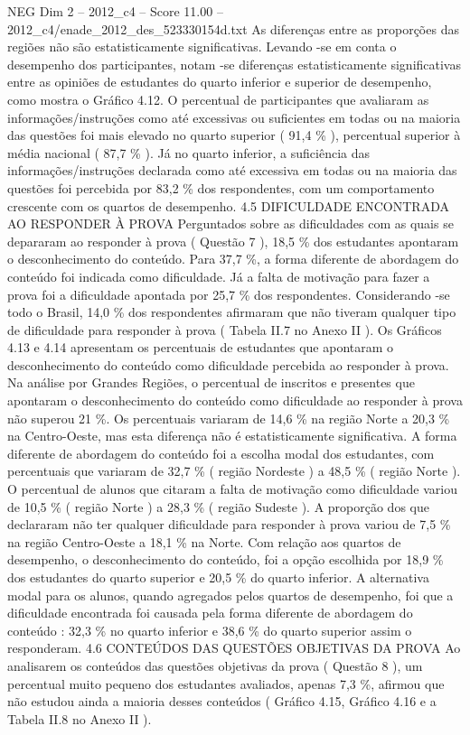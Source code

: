 \begin{textsample}{NEG Dim 2 – 2012\_c4 – Score 11.00 – 2012\_c4/enade\_2012\_des\_523330154d.txt}
As diferenças entre as proporções das regiões não são estatisticamente significativas.
Levando -se em conta o desempenho dos participantes, notam -se diferenças estatisticamente significativas entre as opiniões de estudantes do quarto inferior e superior de desempenho, como mostra o Gráfico 4.12.
O percentual de participantes que avaliaram as informações/instruções como até excessivas ou suficientes em todas ou na maioria das questões foi mais elevado no quarto superior ( 91,4 \% ), percentual superior à média nacional ( 87,7 \% ).
Já no quarto inferior, a suficiência das informações/instruções declarada como até excessiva em todas ou na maioria das questões foi percebida por 83,2 \% dos respondentes, com um comportamento crescente com os quartos de desempenho. 4.5 DIFICULDADE ENCONTRADA AO RESPONDER À PROVA Perguntados sobre as dificuldades com as quais se depararam ao responder à prova ( Questão 7 ), 18,5 \% dos estudantes apontaram o desconhecimento do conteúdo.
Para 37,7 \%, a forma diferente de abordagem do conteúdo foi indicada como dificuldade.
Já a falta de motivação para fazer a prova foi a dificuldade apontada por 25,7 \% dos respondentes.
Considerando -se todo o Brasil, 14,0 \% dos respondentes afirmaram que não tiveram qualquer tipo de dificuldade para responder à prova ( Tabela II.7 no Anexo II ).
Os Gráficos 4.13 e 4.14 apresentam os percentuais de estudantes que apontaram o desconhecimento do conteúdo como dificuldade percebida ao responder à prova.
Na análise por Grandes Regiões, o percentual de inscritos e presentes que apontaram o desconhecimento do conteúdo como dificuldade ao responder à prova não superou 21 \%.
Os percentuais variaram de 14,6 \% na região Norte a 20,3 \% na Centro-Oeste, mas esta diferença não é estatisticamente significativa.
A forma diferente de abordagem do conteúdo foi a escolha modal dos estudantes, com percentuais que variaram de 32,7 \% ( região Nordeste ) a 48,5 \% ( região Norte ).
O percentual de alunos que citaram a falta de motivação como dificuldade variou de 10,5 \% ( região Norte ) a 28,3 \% ( região Sudeste ).
A proporção dos que declararam não ter qualquer dificuldade para responder à prova variou de 7,5 \% na região Centro-Oeste a 18,1 \% na Norte.
Com relação aos quartos de desempenho, o desconhecimento do conteúdo, foi a opção escolhida por 18,9 \% dos estudantes do quarto superior e 20,5 \% do quarto inferior.
A alternativa modal para os alunos, quando agregados pelos quartos de desempenho, foi que a dificuldade encontrada foi causada pela forma diferente de abordagem do conteúdo : 32,3 \% no quarto inferior e 38,6 \% do quarto superior assim o responderam. 4.6 CONTEÚDOS DAS QUESTÕES OBJETIVAS DA PROVA Ao analisarem os conteúdos das questões objetivas da prova ( Questão 8 ), um percentual muito pequeno dos estudantes avaliados, apenas 7,3 \%, afirmou que não estudou ainda a maioria desses conteúdos ( Gráfico 4.15, Gráfico 4.16 e a Tabela II.8 no Anexo II ).

\end{textsample}
